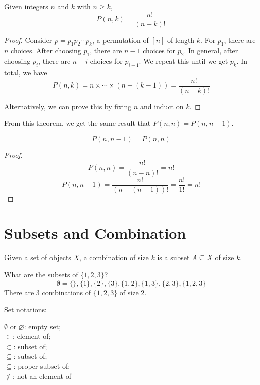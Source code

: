 \begin{theorem}
   Given integers $n$ and $k$ with $n \geq k$,
   $$
   P(n,k) = \frac{n!}{(n-k)!}
   $$
\end{theorem}

\begin{proof}
   Consider $p=p_1p_2\cdots p_k$, a permutation of $[n]$ of length $k$. For $p_1$, there are $n$ choices. After choosing $p_1$, there are $n-1$ choices for $p_2$. In general, after choosing $p_i$, there are $n-i$ choices for $p_{i+1}$. We repeat this until we get $p_k$. In total, we have
   $$
   P(n,k) = n \times \cdots \times (n-(k-1)) = \frac{n!}{(n-k)!}
   $$

   Alternatively, we can prove this by fixing $n$ and induct on $k$.
\end{proof}

From this theorem, we get the same result that $P(n,n) = P(n,n-1)$.
\begin{corollary}
   $$
   P(n,n-1) = P(n,n)
   $$
\end{corollary}
\begin{proof}
   $$
   P(n,n) = \frac{n!}{(n-n)!} = n!
   $$
   $$
   P(n,n-1) = \frac{n!}{(n-(n-1))!} = \frac{n!}{1!} = n!
   $$
\end{proof}


\section{Subsets and Combination}

\begin{definition}[Combination]
   Given a set of objects $X$, a combination of size $k$ is a subset $A \subseteq X$ of size $k$.
\end{definition}

\begin{example}
   What are the subsets of $\{1,2,3\}$?
   $$
   \emptyset=\{\}, \{1\}, \{2\}, \{3\}, \{1,2\}, \{1,3\}, \{2,3\}, \{1,2,3\}
   $$
   There are 3 combinations of $\{1,2,3\}$ of size 2.
\end{example}

Set notations:
\begin{multicols}{3}
   $\emptyset$ or $\varnothing$: empty set; \\
   $\in$: element of; \\
   $\subset$: subset of; \\
   $\subseteq$: subset of; \\
   $\subseteq$: proper subset of; \\
   $\not\in$: not an element of
\end{multicols}

